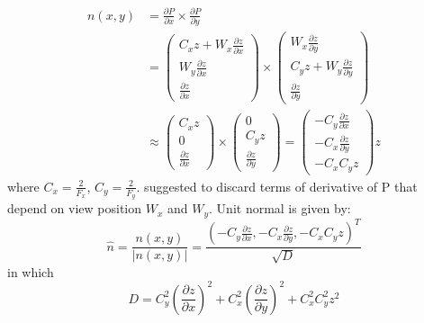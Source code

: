 \begin{align} \label{eq:surface_normal}
n(x, y) &=  \frac{\partial P}{\partial x} \times \frac{\partial P}{\partial y}  \nonumber \\
	&= 
		\begin{pmatrix} 
			C_x z  + W_x \frac{\partial z}{\partial x} \\
			W_y \frac{\partial z}{\partial x} \\
			\frac{\partial z}{\partial x}
		\end{pmatrix}
		\times
		\begin{pmatrix} 
			W_x \frac{\partial z}{\partial y} \\
			C_y z  + W_y \frac{\partial z}{\partial y} \\
			\frac{\partial z}{\partial y}
		\end{pmatrix} \nonumber \\		
	&\approx
		\begin{pmatrix}
			C_x z \\
			0 \\
			\frac{\partial z}{\partial x}
		\end{pmatrix}
		\times
		\begin{pmatrix}
			0 \\
			C_y z \\
			\frac{\partial z}{\partial y}
		\end{pmatrix}
		=
		\begin{pmatrix}
			-C_y \frac{\partial z}{\partial x} \\
			-C_x \frac{\partial z}{\partial y} \\
			-C_x  C_y z 
		\end{pmatrix} z
\end{align}
where $C_x = \frac{2}{F_x}$, $C_y = \frac{2}{F_y}$. \cite{laanSainz2009} suggested to discard terms of derivative of P that depend on view position $W_x$ and $W_y$. Unit normal is given by:
\begin{equation}
	\hat{n} = \frac{n(x, y)}{|n(x, y)|} = \frac{\left(-C_y \frac{\partial z}{\partial x}, -C_x \frac{\partial z}{\partial y}, -C_x  C_y z\right)^T}{\sqrt{D}}
\end{equation}
in which
\begin{equation}
D = C^2_y \left(\frac{\partial z}{\partial x}\right)^2 + C^2_x \left(\frac{\partial z}{\partial y}\right)^2 + C^2_x  C^2_y z^2 
\end{equation}

